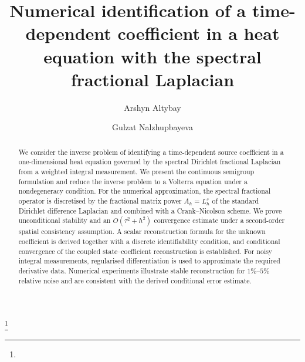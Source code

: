 \documentclass[reqno]{amsart}
\begin{document}
\title[Identification of a time-dependent coefficient]
{Numerical identification of a time-dependent coefficient in a heat equation with the spectral fractional Laplacian}

\author[Arshyn Altybay]{Arshyn Altybay}
\address{
Arshyn Altybay (corresponding author):
\endgraf
Institute of Mathematics and Mathematical Modeling,
 Pushkin str., 050010 Almaty, Kazakhstan
\endgraf
and
\endgraf
International Engineering and Technological University, Almaty, Kazakhstan
\endgraf
{\it E-mail address} {\rm arshyn.altybay@gmail.com, arshyn.altybay@math.kz}
}

\author[G. Nalzhupbayeva]{Gulzat Nalzhupbayeva}
\address{
Gulzat Nalzhupbayeva:
\endgraf
al--Farabi Kazakh National University
 al--Farabi ave., 050040 Almaty, Kazakhstan
\endgraf
and
\endgraf
Institute of Mathematics and Mathematical Modeling
 Pushkin str., 050010 Almaty, Kazakhstan
\endgraf
{\it E-mail address:} {\rm gulzat.nalzhupbayeva@gmail.com}
}

\thanks{}

\begin{abstract}
We consider the inverse problem of identifying a time-dependent source coefficient in a one-dimensional heat equation governed by the spectral Dirichlet fractional Laplacian from a weighted integral measurement. We present the continuous semigroup formulation and reduce the inverse
problem to a Volterra equation under a nondegeneracy condition. For the numerical approximation, the spectral fractional operator is discretised by the fractional matrix power $A_h=L_h^s$ of the standard Dirichlet difference Laplacian and combined with a Crank--Nicolson scheme. We prove unconditional stability and an $O(\tau^2+h^2)$ convergence estimate under a second-order spatial consistency assumption. A scalar reconstruction formula for the unknown coefficient is derived together with a discrete identifiability condition, and conditional convergence of the coupled state--coefficient reconstruction is established. For noisy integral measurements, regularised differentiation is used to approximate the required derivative data. Numerical experiments
illustrate stable reconstruction for \(1\%\)--\(5\%\) relative noise and are consistent with the derived conditional error estimate.
\end{abstract}
\end{document}
